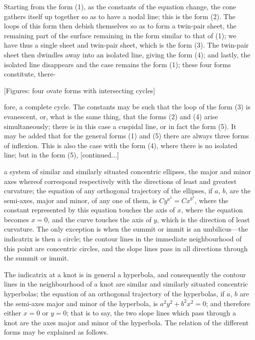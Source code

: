 \documentclass[11pt,a4paper]{book}
\begin{document}
Starting from the form (1), as the constants of the equation change, the cone gathers itself up together so as to have a nodal line; this is the form (2). The loops of this form then debish themselves so as to form a twin-pair sheet, the remaining part of the surface remaining in the form similar to that of (1); we have thus a single sheet and twin-pair sheet, which is the form (3). The twin-pair sheet then dwindles away into an isolated line, giving the form (4); and lastly, the isolated line disappears and the case remains the form (1); these four forms constitute, there-

\begin{center}
[Figures: four ovate forms with intersecting cycles]
\end{center}

\noindent
fore, a complete cycle. The constants may be such that the loop of the form (3) is evanescent, or, what is the same thing, that the forms (2) and (4) arise simultaneously; there is in this case a cuspidal line, or in fact the form (5). It may be added that for the general forms (1) and (5) there are always three forms of inflexion. This is also the case with the form (4), where there is no isolated line; but in the form (5), [continued...]

\setcounter{page}{110}

a system of similar and similarly situated concentric ellipses, the major and minor axes whereof correspond respectively with the directions of least and greatest curvature; the equation of any orthogonal trajectory of the ellipses, if $a$, $b$, are the semi-axes, major and minor, of any one of them, is $Cy^{a^2} = Cx^{b^2}$, where the constant represented by this equation touches the axis of $x$, where the equation becomes $x=0$, and the curve touches the axis of $y$, which is the direction of least curvature. The only exception is when the summit or immit is an umbilicus---the indicatrix is then a circle; the contour lines in the immediate neighbourhood of this point are concentric circles, and the slope lines pass in all directions through the summit or immit.

The indicatrix at a knot is in general a hyperbola, and consequently the contour lines in the neighbourhood of a knot are similar and similarly situated concentric hyperbolas; the equation of an orthogonal trajectory of the hyperbolas, if $a$, $b$ are the semi-axes major and minor of the hyperbola, is $a^2y^2 + b^2x^2 = 0$; and therefore either $x=0$ or $y=0$; that is to say, the two slope lines which pass through a knot are the axes major and minor of the hyperbola. The relation of the different forms may be explained as follows.
\end{document}
